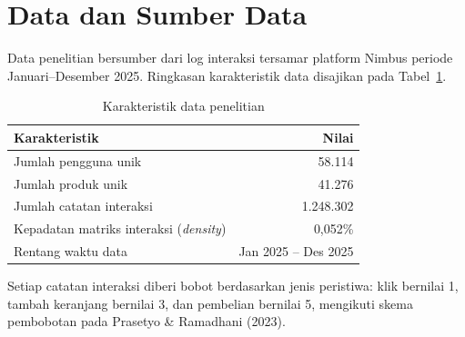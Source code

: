 \section{Data dan Sumber Data}
Data penelitian bersumber dari log interaksi tersamar platform Nimbus
periode Januari--Desember 2025. Ringkasan karakteristik data disajikan
pada Tabel~\ref{tab:data}.

\begin{table}[htb]
\centering
\caption{Karakteristik data penelitian}
\label{tab:data}
\begin{tabularx}{\textwidth}{@{}Xr@{}}
\toprule
\textbf{Karakteristik} & \textbf{Nilai} \\
\midrule
Jumlah pengguna unik & 58.114 \\
Jumlah produk unik & 41.276 \\
Jumlah catatan interaksi & 1.248.302 \\
Kepadatan matriks interaksi (\emph{density}) & 0,052\% \\
Rentang waktu data & Jan 2025 -- Des 2025 \\
\bottomrule
\end{tabularx}
\end{table}

Setiap catatan interaksi diberi bobot berdasarkan jenis peristiwa: klik
bernilai 1, tambah keranjang bernilai 3, dan pembelian bernilai 5,
mengikuti skema pembobotan pada Prasetyo \& Ramadhani (2023).
